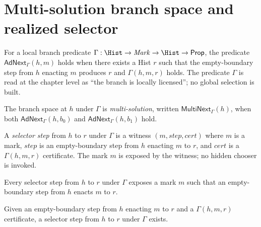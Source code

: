 \section{Multi-solution branch space and realized selector}
\label{sec:efm-multi-branch}

\begin{definition}
\label{def:efm-adnext}
For a local branch predicate $\Gamma : \Hist \to \mathit{Mark} \to \Hist \to \mathsf{Prop}$, the predicate $\mathsf{AdNext}_\Gamma(h, m)$ holds when there exists a Hist $r$ such that the empty-boundary step from $h$ enacting $m$ produces $r$ and $\Gamma(h, m, r)$ holds. The predicate $\Gamma$ is read at the chapter level as ``the branch is locally licensed''; no global selection is built.
\end{definition}

\begin{definition}
\label{def:efm-multinext}
The branch space at $h$ under $\Gamma$ is \emph{multi-solution}, written $\mathsf{MultiNext}_\Gamma(h)$, when both $\mathsf{AdNext}_\Gamma(h, b_0)$ and $\mathsf{AdNext}_\Gamma(h, b_1)$ hold.
\end{definition}

\begin{definition}
\label{def:efm-selstep}
A \emph{selector step} from $h$ to $r$ under $\Gamma$ is a witness $(m, \mathit{step}, \mathit{cert})$ where $m$ is a mark, $\mathit{step}$ is an empty-boundary step from $h$ enacting $m$ to $r$, and $\mathit{cert}$ is a $\Gamma(h, m, r)$ certificate. The mark $m$ is exposed by the witness; no hidden chooser is invoked.
\end{definition}

\begin{theorem}
\label{thm:efm-selstep-exposes}
Every selector step from $h$ to $r$ under $\Gamma$ exposes a mark $m$ such that an empty-boundary step from $h$ enacts $m$ to $r$.
\end{theorem}

\begin{theorem}
\label{thm:efm-selstep-from-step}
Given an empty-boundary step from $h$ enacting $m$ to $r$ and a $\Gamma(h, m, r)$ certificate, a selector step from $h$ to $r$ under $\Gamma$ exists.
\end{theorem}

